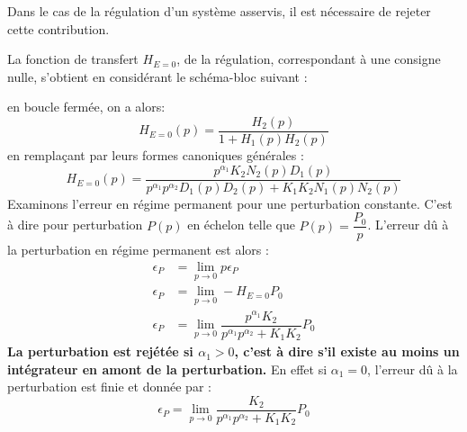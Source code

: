 Dans le cas de la régulation d'un système asservis, il est nécessaire de 
rejeter cette contribution.

La fonction de transfert $H_{E=0}$, de la régulation, correspondant à une 
consigne nulle, s'obtient en considérant le schéma-bloc suivant :
\begin{center}                                                  
    
\end{center}                                                    
\newcommand{\pau}{p^{\alpha_1}}
\newcommand{\pad}{p^{\alpha_2}}
en boucle fermée, on a alors:
$$
H_{E=0}(p)=\dfrac{H_2(p)}{1+H_1(p)H_2(p)}
$$
en remplaçant par leurs formes canoniques générales :
$$
H_{E=0}(p)=
\dfrac{\pau K_2N_2(p)D_1(p)}{\pau\pad D_1(p)D_2(p)+K_1K_2N_1(p)N_2(p)}
$$
Examinons l'erreur en régime permanent pour une perturbation constante.
C'est à dire pour perturbation $P(p)$ en échelon telle que 
$P(p)=\dfrac{P_0}{p}$. L'erreur dû à la perturbation en régime permanent 
est alors :
\begin{align*}
    \epsilon_P&=\lim\limits_{p\to0} p\epsilon_P\\
    \epsilon_P&=\lim\limits_{p\to0} -H_{E=0}P_0\\
    \epsilon_P&=\lim\limits_{p\to0}\dfrac{\pau K_2}{\pau\pad+K_1K_2}P_0
\end{align*}
\textbf{La perturbation est rejétée si $\alpha_1>0$, c'est à dire s'il existe
au moins un intégrateur en amont de la perturbation.}
En effet si $\alpha_1=0$, l'erreur dû à la perturbation est finie et 
donnée par :
$$
\epsilon_P=\lim\limits_{p\to0}\dfrac{K_2}{\pau\pad+K_1K_2}P_0
$$
